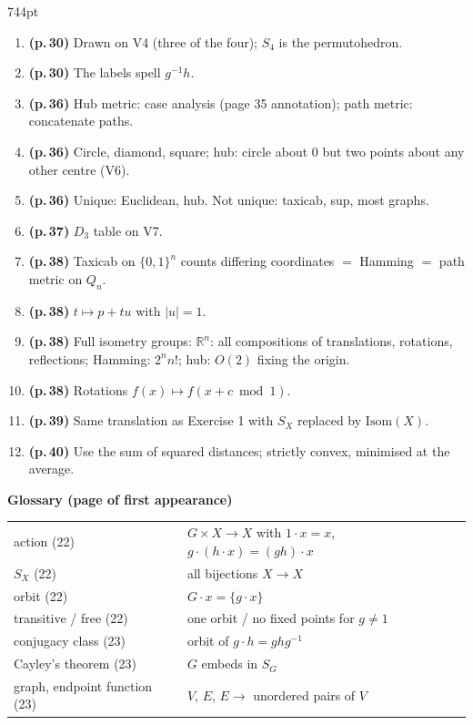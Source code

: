 \documentclass[10pt]{article}
\newcommand{\R}{\mathbb{R}}
\newcommand{\inv}{^{-1}}
\begin{document}
\begin{textblock*}{744pt}
\begin{minipage}[t]{400pt}
\begin{enumerate}[leftmargin=*,itemsep=1pt]
\item \textbf{(p.\,30)} Drawn on V4 (three of the four); $S_4$ is the permutohedron.
\item \textbf{(p.\,30)} The labels spell $g\inv h$.
\item \textbf{(p.\,36)} Hub metric: case analysis (page 35 annotation); path metric: concatenate paths.
\item \textbf{(p.\,36)} Circle, diamond, square; hub: circle about $0$ but two points about any other centre (V6).
\item \textbf{(p.\,36)} Unique: Euclidean, hub. Not unique: taxicab, sup, most graphs.
\item \textbf{(p.\,37)} $D_3$ table on V7.
\item \textbf{(p.\,38)} Taxicab on $\{0,1\}^n$ counts differing coordinates $=$ Hamming $=$ path metric on $Q_n$.
\item \textbf{(p.\,38)} $t\mapsto p+tu$ with $|u|=1$.
\item \textbf{(p.\,38)} Full isometry groups: $\R^n$: all compositions of translations, rotations, reflections; Hamming: $2^n n!$; hub: $O(2)$ fixing the origin.
\item \textbf{(p.\,38)} Rotations $f(x)\mapsto f(x+c\bmod1)$.
\item \textbf{(p.\,39)} Same translation as Exercise 1 with $S_X$ replaced by $\mathrm{Isom}(X)$.
\item \textbf{(p.\,40)} Use the sum of squared distances; strictly convex, minimised at the average.
\end{enumerate}
\end{minipage}\hfill
\begin{minipage}[t]{330pt}
\scriptsize
{\sffamily\bfseries Glossary (page of first appearance)}\par\vspace{3pt}
\begin{tabular}{@{}p{100pt}p{225pt}@{}}
action (22) & $G\times X\to X$ with $1\cdot x=x$, $g\cdot(h\cdot x)=(gh)\cdot x$\\
$S_X$ (22) & all bijections $X\to X$\\
orbit (22) & $G\cdot x=\{g\cdot x\}$\\
transitive / free (22) & one orbit / no fixed points for $g\ne1$\\
conjugacy class (23) & orbit of $g\cdot h=ghg\inv$\\
Cayley's theorem (23) & $G$ embeds in $S_G$\\
graph, endpoint function (23) & $V$, $E$, $E\to$ unordered pairs of $V$\\

\end{tabular}
\end{minipage}
\end{textblock*}
\end{document}
